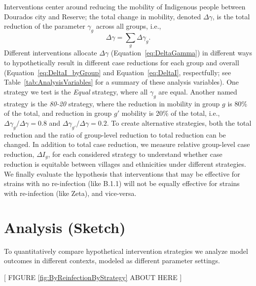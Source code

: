 \documentclass[
  letterpaper,
  abstract]{scrartcl}
\begin{document}
Interventions center around reducing the mobility of Indigenous people between
Dourados city and Reserve; the total change in mobility, denoted $\Delta
\gamma$, is the total reduction of the parameter $\gamma_g$ across all 
groups, i.e., 
\begin{equation}
  \Delta \gamma = \sum_g \Delta \gamma_g.
  \label{eq:DeltaGamma}
\end{equation}
\noindent
Different interventions allocate $\Delta \gamma$ (Equation~\ref{eq:DeltaGamma})
in different ways to hypothetically result in different case reductions for each
group and overall (Equation~\ref{eq:DeltaI_byGroup} and Equation~\ref{eq:DeltaI},
respectfully; see Table~\ref{tab:AnalysisVariables} for a summary of these analysis
variables).
One strategy we test is the \emph{Equal} strategy, where all $\gamma_g$ are
equal. Another named strategy is the \emph{80-20} strategy, where the
reduction in mobility in group $g$ is 80\% of the total, and reduction in
group $g'$ mobility is 20\% of the total, i.e., $\Delta\gamma_g / \Delta\gamma =
0.8$ and $\Delta\gamma_{g'} / \Delta\gamma = 0.2$. To create alternative
strategies, both the total reduction and the ratio of group-level reduction to 
total reduction can be changed. In addition to total case reduction, we 
measure relative group-level case reduction, $\Delta I_g$, 
for each considered strategy to understand whether case reduction is equitable
between villages and ethnicities under different strategies. 
We finally evaluate the hypothesis that interventions that may be effective for
strains with no re-infection (like B.1.1) will not be equally effective for
strains with re-infection (like Zeta), and vice-versa. 


\section{Analysis (Sketch)}\label{analysis-sketch}


To quantitatively compare hypothetical intervention strategies we analyze 
model outcomes in different contexts, modeled as different parameter settings.

\vspace{0.5em}
\begin{center}
{[ FIGURE \ref{fig:ByReinfectionByStrategy} ABOUT HERE ]} \\
\end{center}
\end{document}
